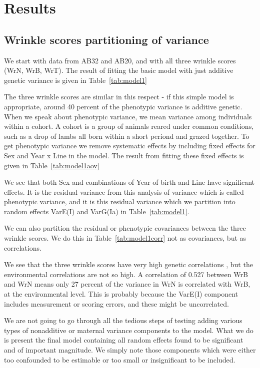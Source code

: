 \documentclass[titlepage]{article}  %
\begin{document}
\section{Results}
\subsection{Wrinkle scores partitioning of variance}
We start with data from AB32 and AB20, and with all three wrinkle scores (WrN, WrB, WrT). The result of fitting the basic model with just additive genetic variance is given in Table~\ref{tab:model1}

The three wrinkle scores are similar in this respect - if this simple model is appropriate, around 40 percent of the phenotypic variance is additive genetic. When we speak about phenotypic variance, we mean variance among individuals within a cohort. A cohort is a group of animals reared under common conditions, such as a drop of lambs all born within a short periond and grazed together. To get phenotypic variance we remove systematic effects by including fixed effects for Sex and Year x Line in the model. The result from fitting these fixed effects is given in Table~\ref{tab:model1aov}

We see that both Sex and combinations of Year of birth and Line have significant effects. It is the residual variance from this analysis of variance which is called phenotypic variance, and it is this residual variance which we partition into random effects VarE(I) and VarG(Ia) in Table~\ref{tab:model1}.

We can also partition the residual or phenotypic covariances between the three wrinkle scores. We do this in Table~\ref{tab:model1corr} not as covariances, but as correlations.

We see that the three wrinkle scores have  very high genetic correlations , but the environmental correlations are not so high. A correlation of 0.527 between WrB and WrN means only 27 percent of the variance in WrN is correlated with WrB, at the environmental level. This is probably because the VarE(I) component includes measurement or scoring errors, and these might be uncorrelated.

We are not going to go through all the tedious steps of testing adding various types of nonadditive or maternal variance components to the model. What we do is present the final model containing all random effects found to be significant and of important magnitude. We simply note those components which were either too confounded to be estimable or too small or insignificant to be included. 
\end{document}

